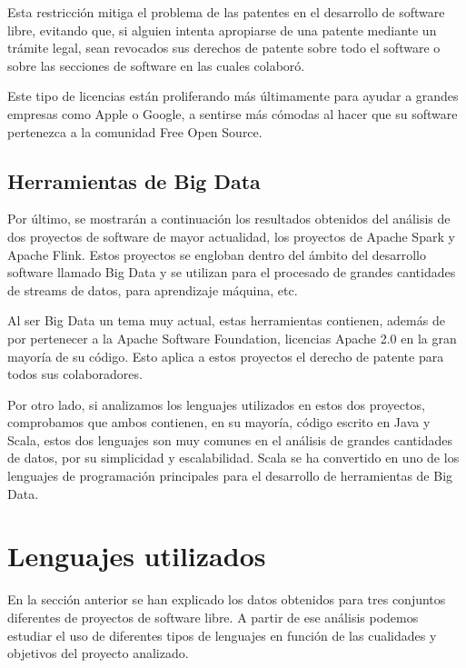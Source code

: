 \documentclass[a4paper, spanish, 12pt]{book}
\begin{document}
Esta restricci\'on mitiga el problema de las patentes en el desarrollo de software libre, evitando que, si alguien
intenta apropiarse de una patente mediante un tr\'amite legal, sean revocados sus derechos de patente sobre todo
el software o sobre las secciones de software en las cuales colabor\'o.

Este tipo de licencias est\'an proliferando m\'as \'ultimamente para ayudar a grandes empresas como Apple o Google,
a sentirse m\'as c\'omodas al hacer que su software pertenezca a la comunidad Free Open Source.

\subsection{Herramientas de Big Data}
\label{subsec: big_data}

Por \'ultimo, se mostrar\'an a continuaci\'on los resultados obtenidos del an\'alisis de dos proyectos de software de
mayor actualidad, los proyectos de Apache Spark y Apache Flink. Estos proyectos se engloban dentro del \'ambito del
desarrollo software llamado Big Data y se utilizan para el procesado de grandes cantidades de streams de datos, para
aprendizaje m\'aquina, etc.

Al ser Big Data un tema muy actual, estas herramientas contienen, adem\'as de por pertenecer a la Apache Software
Foundation, licencias Apache 2.0 en la gran mayor\'ia de su c\'odigo. Esto aplica a estos proyectos el derecho
de patente para todos sus colaboradores.

Por otro lado, si analizamos los lenguajes utilizados en estos dos proyectos, comprobamos
que ambos contienen, en su mayor\'ia, c\'odigo escrito en Java y Scala, estos dos lenguajes
son muy comunes en el an\'alisis de grandes cantidades de datos, por su simplicidad
y escalabilidad. Scala se ha convertido en uno de los lenguajes de programaci\'on
principales para el desarrollo de herramientas de Big Data.

\section{Lenguajes utilizados}
\label{sec:languages}

En la secci\'on anterior se han explicado los datos obtenidos para tres conjuntos
diferentes de proyectos de software libre. A partir de ese an\'alisis podemos estudiar
el uso de diferentes tipos de lenguajes en funci\'on de las cualidades y objetivos del
proyecto analizado.
\end{document}
